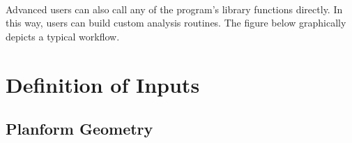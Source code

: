 \documentclass{article}
\begin{document}
\paragraph{}
Advanced users can also call any of the program's library functions
directly.  In this way, users can build custom analysis routines.  The
figure below graphically depicts a typical workflow.
\newline
\newline
{}
\newline
\newline
\section{Definition of Inputs}\label{sec:doi}
\subsection{Planform Geometry}\label{sec:pg}
\end{document}
